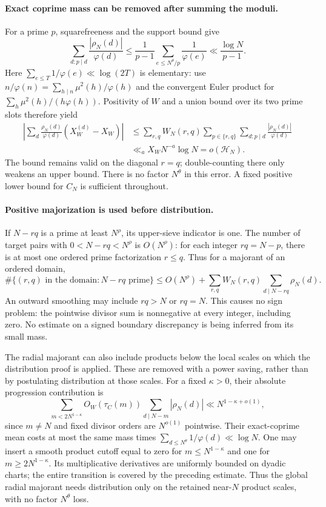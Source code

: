 \paragraph{Exact coprime mass can be removed after summing the moduli.}
For a prime $p$, squarefreeness and the support bound give
\[
 \sum_{d:p\mid d}\frac{|\rho_N(d)|}{\varphi(d)}
 \le\frac1{p-1}\sum_{e\le N^\theta/p}\frac1{\varphi(e)}
 \ll\frac{\log N}{p-1}.
\]
Here $\sum_{e\le T}1/\varphi(e)\ll\log(2T)$ is elementary: use
$n/\varphi(n)=\sum_{h\mid n}\mu^2(h)/\varphi(h)$ and the convergent
Euler product for $\sum_h\mu^2(h)/(h\varphi(h))$.
Positivity of $W$ and a union bound over its two prime slots therefore
yield
\begin{align*}
 \left|\sum_d\frac{\rho_N(d)}{\varphi(d)}
                     (X_W^{(d)}-X_W)\right|
 &\le\sum_{r,q}W_N(r,q)
       \sum_{p\in\{r,q\}}\sum_{d:p\mid d}
                                \frac{|\rho_N(d)|}{\varphi(d)}\\
 &\ll_a X_W N^{-a}\log N=o(\mathcal H_N).
\end{align*}
The bound remains valid on the diagonal $r=q$; double-counting there
only weakens an upper bound. There is no factor $N^\theta$ in this
error. A fixed positive lower bound for $C_N$ is sufficient throughout.

\paragraph{Positive majorization is used before distribution.}
If $N-rq$ is a prime at least $N^\rho$, its upper-sieve indicator is
one. The number of target pairs with $0<N-rq<N^\rho$ is
$O(N^\rho)$: for each integer $rq=N-p$, there is at most one ordered
prime factorization $r\le q$. Thus for a majorant of an ordered domain,
\[
 \#\{(r,q)\text{ in the domain}:N-rq\text{ prime}\}
 \le O(N^\rho)+\sum_{r,q}W_N(r,q)\sum_{d\mid N-rq}\rho_N(d).
\]
An outward smoothing may include $rq>N$ or $rq=N$. This causes no
sign problem: the pointwise divisor sum is nonnegative at every
integer, including zero. No estimate on a signed boundary discrepancy
is being inferred from its small mass.

The radial majorant can also include products below the local scales
on which the distribution proof is applied. These are removed with a
power saving, rather than by postulating distribution at those scales.
For a fixed $\kappa>0$, their absolute progression contribution is
\[
 \sum_{m<2N^{1-\kappa}} O_W(\tau_C(m))
              \sum_{d\mid N-m}|\rho_N(d)|
 \ll N^{1-\kappa+o(1)},
\]
since $m\ne N$ and fixed divisor orders are $N^{o(1)}$ pointwise.
Their exact-coprime mean costs at most the same mass times
$\sum_{d\le N^\theta}1/\varphi(d)\ll\log N$.
One may insert a smooth product cutoff equal to zero for
$m\le N^{1-\kappa}$ and one for $m\ge2N^{1-\kappa}$.
Its multiplicative derivatives are uniformly bounded on dyadic
charts; the entire transition is covered by the preceding estimate.
Thus the global radial majorant needs distribution only on the
retained near-$N$ product scales, with no factor $N^\theta$ loss.

